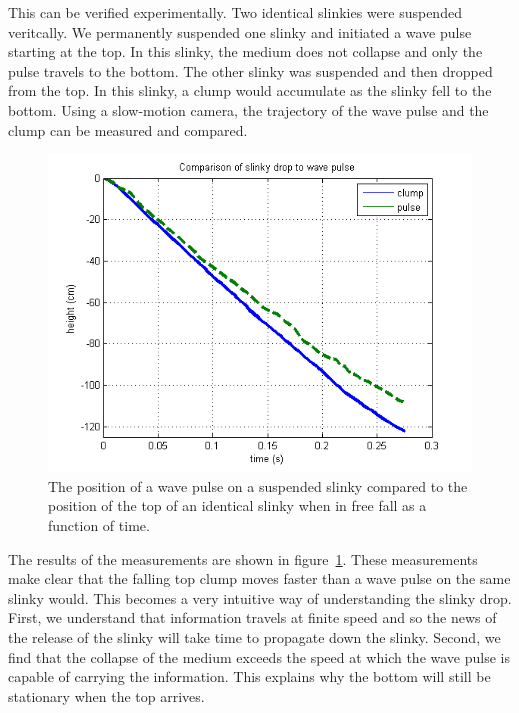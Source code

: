 \documentclass[prb,preprint]{revtex4-1}
\newcommand{\fig}[1]{figure~\ref{fig:#1}}
\begin{document}
This can be verified experimentally. Two identical slinkies were suspended veritcally.
We permanently suspended one slinky and initiated a wave pulse starting at the top.
In this slinky, the medium does not collapse and only the pulse travels to the bottom. The other slinky was suspended and then dropped from the top. In this
slinky, a clump would accumulate as the slinky fell to the bottom. Using a slow-motion camera, the trajectory of the wave pulse
and the clump can be measured and compared.

\begin{figure}[t!]
\begin{center}
\includegraphics[scale=0.5]{figs/ClumpPulse}
\end{center}
\vspace{-4ex}
\caption{The position of a wave pulse on a suspended slinky compared to the position
of the top of an identical slinky when in free fall as a function of time.}
\label{fig:clumppulse}
\end{figure}

The results of the measurements are shown in \fig{clumppulse}. These measurements
make clear that the falling top clump moves faster than a wave pulse on the same
slinky would. This becomes a very intuitive way of understanding the
slinky drop. First, we understand that information travels at finite speed and so
the news of the release of the slinky will take time to propagate down the slinky.
Second, we find that the collapse of the medium exceeds the speed at which
the wave pulse is capable of carrying the information. This explains why the
bottom will still be stationary when the top arrives.
\end{document}
